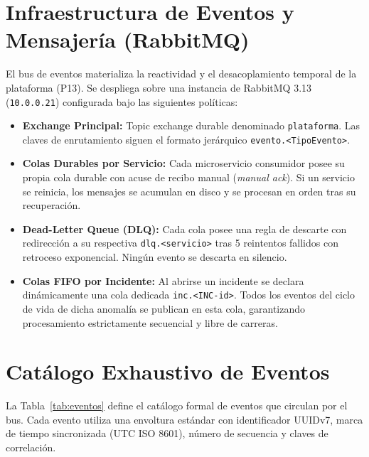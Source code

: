 \documentclass[11pt,a4paper]{report}
\begin{document}
\section{Infraestructura de Eventos y Mensajería (RabbitMQ)}
El bus de eventos materializa la reactividad y el desacoplamiento temporal de la plataforma (P13). Se despliega sobre una instancia de RabbitMQ 3.13 (\texttt{10.0.0.21}) configurada bajo las siguientes políticas:
\begin{itemize}[leftmargin=*]
    \item \textbf{Exchange Principal:} Topic exchange durable denominado \texttt{plataforma}. Las claves de enrutamiento siguen el formato jerárquico \texttt{evento.<TipoEvento>}.
    \item \textbf{Colas Durables por Servicio:} Cada microservicio consumidor posee su propia cola durable con acuse de recibo manual (\emph{manual ack}). Si un servicio se reinicia, los mensajes se acumulan en disco y se procesan en orden tras su recuperación.
    \item \textbf{Dead-Letter Queue (DLQ):} Cada cola posee una regla de descarte con redirección a su respectiva \texttt{dlq.<servicio>} tras 5 reintentos fallidos con retroceso exponencial. Ningún evento se descarta en silencio.
    \item \textbf{Colas FIFO por Incidente:} Al abrirse un incidente se declara dinámicamente una cola dedicada \texttt{inc.<INC-id>}. Todos los eventos del ciclo de vida de dicha anomalía se publican en esta cola, garantizando procesamiento estrictamente secuencial y libre de carreras.
\end{itemize}

\section{Catálogo Exhaustivo de Eventos}
La Tabla~\ref{tab:eventos} define el catálogo formal de eventos que circulan por el bus. Cada evento utiliza una envoltura estándar con identificador UUIDv7, marca de tiempo sincronizada (UTC ISO 8601), número de secuencia y claves de correlación.
\end{document}
